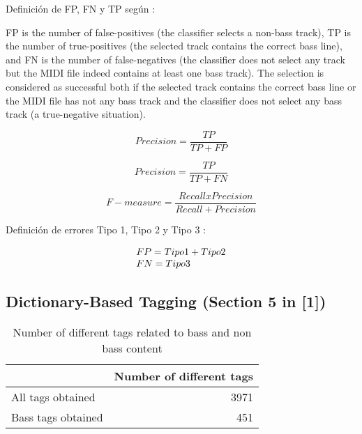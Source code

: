 \documentclass{article}
\begin{document}
Definición de FP, FN y TP según \cite{vicente2012bass}:


FP is the number of false-positives (the classifier selects a non-bass track), TP is the number of true-positives (the selected track contains the correct bass line), and FN is the number of false-negatives (the classifier does not select any track but the MIDI file indeed contains at least one bass track).
The selection is considered as successful both if the selected track contains the correct bass line or the MIDI file has not any bass track and the classifier does not select any bass track (a true-negative situation). 

\begin{equation}
Precision=\frac{TP}{TP + FP}
\end{equation}

\begin{equation}
Precision=\frac{TP}{TP + FN}
\end{equation}

\begin{equation}
F-measure=\frac{Recall x Precision}{Recall + Precision}
\end{equation}


Definición de errores Tipo 1, Tipo 2 y Tipo 3 \cite{de2011statistical}:

\begin{equation}
\begin{array}{l l }
FP = Tipo 1 + Tipo 2 \\
FN = Tipo 3 \\    
\end{array}
\end{equation}





\subsection{Dictionary-Based Tagging (Section 5 in [1])}


\begin{table}
\begin{center}
\begin{tabular}{  l | r }
\hline
 & Number of different tags \\
\hline
\hline
All tags obtained & 3971 \\
\hline
Bass tags obtained & 451 \\
\hline
\end{tabular}
\caption{Number of different tags related to bass and non bass content}
\end{center}
\end{table}
\end{document}
